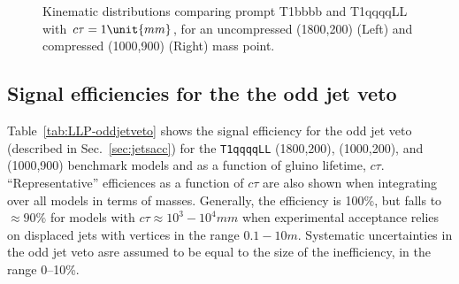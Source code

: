 \begin{figure}[h!]
\begin{center}
     \\
     ~
    \caption{Kinematic distributions comparing prompt T1bbbb and
      T1qqqqLL with $\ctau = 1\unit{mm}$, for an uncompressed
      (1800,200) (Left) and compressed (1000,900) (Right) mass point.}
    \label{fig:T1qqqqLLvsT1bbbb}
  \end{center}
\end{figure}

\clearpage
\subsection{Signal efficiencies for the the odd jet veto}
\label{app:LLP-jetid}

Table~\ref{tab:LLP-oddjetveto} shows the signal efficiency for the odd
jet veto (described in Sec.~\ref{sec:jetsacc}) for the
\texttt{T1qqqqLL} (1800,200), (1000,200), and (1000,900) benchmark
models and as a function of gluino lifetime,
$c\tau$. ``Representative'' efficiences as a function of $c\tau$ are
also shown when integrating over all models in terms of masses.
Generally, the efficiency is 100\%, but falls to ${\approx}90\%$ for
models with $c\tau \approx 10^{3} - 10^{4}\unit{mm}$ when experimental
acceptance relies on displaced jets with vertices in the range
$0.1-10\unit{m}$. Systematic uncertainties in the odd jet veto asre
assumed to be equal to the size of the inefficiency, \ie in the range
0--10\%.


